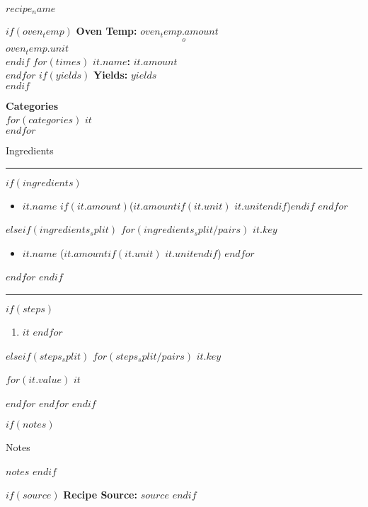 \documentclass{scrartcl}
\begin{document}
\begin{center}
{\huge $recipe_name$}
\end{center}

\vspace{1cm}

\begin{minipage}[t]{3in}
  $if(oven_temp)$
    \textbf{Oven Temp:} $oven_temp.amount$$$^o$$$oven_temp.unit$\\
  $endif$
  $for(times)$
    \textbf{$it.name$:} $it.amount$\\
  $endfor$
  $if(yields)$
    \textbf{Yields:} $yields$\\
  $endif$
\end{minipage}
\hfill
\begin{minipage}[t]{3in}
  \begin{flushright}
  \textbf{{\large Categories}}\\
  $for(categories)$
    $it$\\
  $endfor$
  \end{flushright}
\end{minipage}


\bigskip

\begin{center}
{\Large Ingredients}
\end{center}
\vspace{3mm}
\hrule

$if(ingredients)$
  \begin{multicols}{2}
    \begin{itemize}
      $for(ingredients)$
        \item $it.name$ $if(it.amount)$($it.amount$$if(it.unit)$ $it.unit$$endif$)$endif$
      $endfor$
    \end{itemize}
  \end{multicols}
$elseif(ingredients_split)$
  $for(ingredients_split/pairs)$
  \textbf{\large $it.key$}
    \begin{multicols}{2}
      \begin{itemize}
        $for(it.value)$
          \item $it.name$ ($it.amount$$if(it.unit)$ $it.unit$$endif$)
        $endfor$
      \end{itemize}
    \end{multicols}
  $endfor$
$endif$

\hrule
\medskip

$if(steps)$
  \begin{enumerate}
    $for(steps)$
    \item $it$
    $endfor$
  \end{enumerate}
$elseif(steps_split)$
  $for(steps_split/pairs)$
    \textbf{\large $it.key$}

    \medskip
    $for(it.value)$
      $it$

      \medskip
    $endfor$
  $endfor$
$endif$

$if(notes)$
  \begin{center}
  {\Large Notes}
  \end{center}
  $notes$
$endif$

$if(source)$
  \vfill
  \textbf{Recipe Source:} $source$
$endif$
\end{document}
